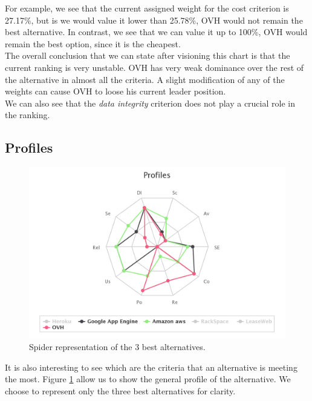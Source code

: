 \documentclass[a4paper,11pt]{article}
\begin{document}
For example, we see that the current assigned weight for the cost criterion is 27.17\%, but is we would value it lower than 25.78\%, OVH would not remain the best alternative. In contrast, we see that we can value it up to 100\%, OVH would remain the best option, since it is the cheapest. \\

The overall conclusion that we can state after visioning this chart is that the current ranking is very unstable. OVH has very weak dominance over the rest of the alternative in almost all the criteria. A slight modification of any of the weights can cause OVH to loose his current leader position.\\

We can also see that the \textit{data integrity} criterion does not play a crucial role in the ranking.

\subsection{Profiles}

\begin{figure}
\centering
  \includegraphics[width=\textwidth-2cm]{img/Result/spider_web-3best.png}
\caption{\og Spider \fg{} representation of the 3 best alternatives.}
  \label{fig:spider}
\end{figure}

It is also interesting to see which are the criteria that an alternative is meeting the most. Figure \ref{fig:spider} allow us to show the general profile of the alternative. We choose to represent only the three best alternatives for clarity.\\
\end{document}

